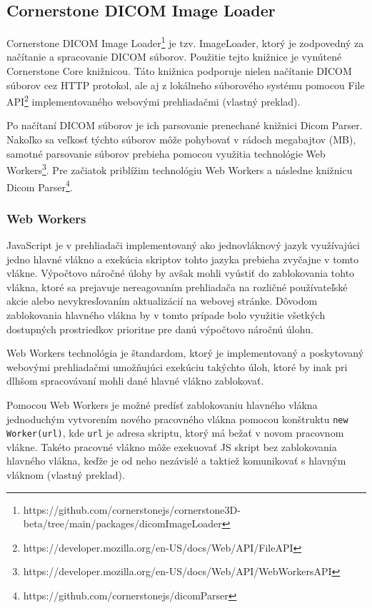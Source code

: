 \subsection {Cornerstone DICOM Image Loader}
Cornerstone DICOM Image Loader\footnote{https://github.com/cornerstonejs/cornerstone3D-beta/tree/main/packages/dicomImageLoader} je tzv. ImageLoader, ktorý je zodpovedný za načítanie a spracovanie DICOM súborov. Použitie tejto knižnice je vynútené Cornerstone Core knižnicou. Táto knižnica podporuje nielen načítanie DICOM súborov cez HTTP protokol, ale aj z lokálneho súborového systému pomocou File API\footnote{https://developer.mozilla.org/en-US/docs/Web/API/File\textunderscore API} implementovaného webovými prehliadačmi \cite{about_cornerstone_dicom_image_loader} (vlastný preklad).

Po načítaní DICOM súborov je ich parsovanie prenechané knižnici Dicom Parser. Nakoľko sa veľkosť týchto súborov môže pohybovať v rádoch megabajtov (MB), samotné parsovanie súborov prebieha pomocou využitia technológie Web Workers\footnote{https://developer.mozilla.org/en-US/docs/Web/API/Web\textunderscore Workers\textunderscore API}. Pre začiatok priblížim technológiu Web Workers a následne knižnicu Dicom Parser\footnote{https://github.com/cornerstonejs/dicomParser}.

\subsubsection {Web Workers}
JavaScript je v prehliadači implementovaný ako jednovláknový jazyk využívajúci jedno hlavné vlákno a exekúcia skriptov tohto jazyka prebieha zvyčajne v tomto vlákne. Výpočtovo náročné úlohy by avšak mohli vyústiť do zablokovania tohto vlákna, ktoré sa prejavuje nereagovaním prehliadača na rozličné používateľské akcie alebo nevykresľovaním aktualizácií na webovej stránke. Dôvodom zablokovania hlavného vlákna by v tomto prípade bolo využitie všetkých dostupných prostriedkov prioritne pre danú výpočtovo náročnú úlohu.

Web Workers technológia je štandardom, ktorý je implementovaný a poskytovaný webovými prehliadačmi umožňujúci exekúciu takýchto úloh, ktoré by inak pri dlhšom spracovávaní mohli dané hlavné vlákno zablokovať.

Pomocou Web Workers je možné predísť zablokovaniu hlavného vlákna jednoduchým vytvorením nového pracovného vlákna pomocou konštruktu \texttt{new Worker(url)}, kde \texttt{url} je adresa skriptu, ktorý má bežať v novom pracovnom vlákne. Takéto pracovné vlákno môže exekuovať JS skript bez zablokovania hlavného vlákna, keďže je od neho nezávislé a taktiež komunikovať s hlavným vláknom \cite{using_web_workers} (vlastný preklad).

